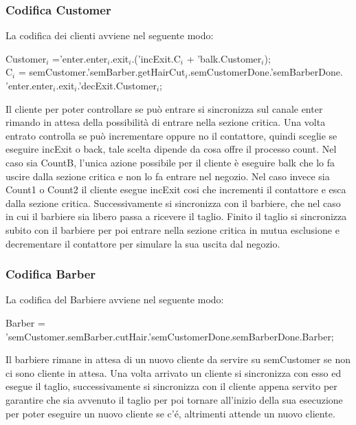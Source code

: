 \subsubsection{Codifica Customer}

La codifica dei clienti avviene nel seguente modo:

\textsf{Customer$_{i}$ ='enter.enter$_{i}$.exit$_{i}$.('incExit.C$_{i}$ + 'balk.Customer$_{i}$);}\\
\textsf{C$_{i}$ = semCustomer.'semBarber.getHairCut$_{i}$.semCustomerDone.'semBarberDone.}\\
\textsf{'enter.enter$_{i}$.exit$_{i}$.'decExit.Customer$_{i}$;}

Il cliente per poter controllare se può entrare si sincronizza sul canale \textsf{enter} rimando in attesa della possibilità di entrare nella sezione critica. Una volta entrato controlla se può incrementare oppure no il contattore, quindi sceglie se eseguire \textsf{incExit} o \textsf{back}, tale scelta dipende da cosa offre il processo \textsf{count}. Nel caso sia \textsf{CountB}, l'unica azione possibile per il cliente è eseguire \textsf{balk} che lo fa uscire dalla sezione critica e non lo fa entrare nel negozio. Nel caso invece sia \textsf{Count1} o \textsf{Count2} il cliente esegue \textsf{incExit} cosi che incrementi il contattore e esca dalla sezione critica. Successivamente si sincronizza con il barbiere, che nel caso in cui il barbiere sia libero passa a ricevere il taglio. Finito il taglio si sincronizza subito con il barbiere per poi entrare nella sezione critica in mutua esclusione e decrementare il contattore per simulare la sua uscita dal negozio.

\subsubsection{Codifica Barber}

La codifica del Barbiere avviene nel seguente modo:

\textsf{Barber = 'semCustomer.semBarber.cutHair.'semCustomerDone.semBarberDone.Barber;}

Il barbiere rimane in attesa di un nuovo cliente da servire su \textsf{semCustomer} se non ci sono cliente in attesa. Una volta arrivato un cliente si sincronizza con esso ed esegue il taglio, successivamente si sincronizza con il cliente appena servito per garantire che sia avvenuto il taglio per poi tornare all'inizio della sua esecuzione per poter eseguire un nuovo cliente se c'é, altrimenti attende un nuovo cliente.

